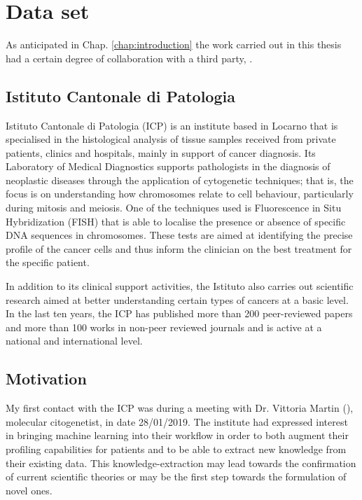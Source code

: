 
\section{Data set} \label{sec:data-set}
As anticipated in Chap. \ref{chap:introduction} the work carried out in this thesis had a certain degree of collaboration with a third party, \cite{istitutocantonalepresentazione}.

\subsection{Istituto Cantonale di Patologia}
Istituto Cantonale di Patologia (ICP) is an institute based in Locarno that is specialised in the histological analysis of tissue samples received from private patients, clinics and hospitals, mainly in support of cancer diagnosis.
Its Laboratory of Medical Diagnostics supports pathologists in the diagnosis of neoplastic diseases through the application of cytogenetic techniques; that is, the focus is on understanding how chromosomes relate to cell behaviour, particularly during mitosis and meiosis.
One of the techniques used is Fluorescence in Situ Hybridization (FISH) that is able to localise the presence or absence of specific DNA sequences in chromosomes.
These tests are aimed at identifying the precise profile of the cancer cells and thus inform the clinician on the best treatment for the specific patient.

In addition to its clinical support activities, the Istituto also carries out scientific research aimed at better understanding certain types of cancers at a basic level.
In the last ten years, the ICP has published more than 200 peer-reviewed papers and more than 100 works in non-peer reviewed journals and is active at a national and international level.

\subsection{Motivation}
My first contact with the ICP was during a meeting with Dr. Vittoria Martin (\cite{martin2012}), molecular citogenetist, in date 28/01/2019.
The institute had expressed interest in bringing machine learning into their workflow in order to both augment their profiling capabilities for patients and to be able to extract new knowledge from their existing data.
This knowledge-extraction may lead towards the confirmation of current scientific theories or may be the first step towards the formulation of novel ones.

